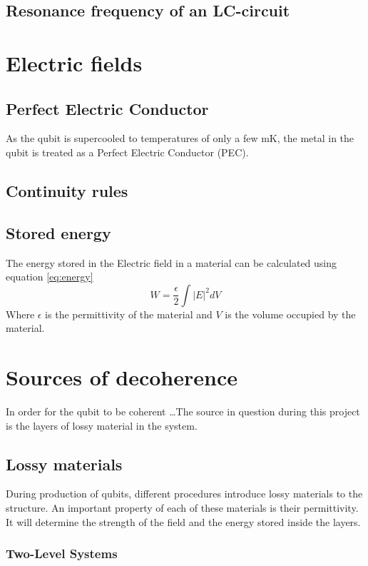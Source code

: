 \subsection{Resonance frequency of an LC-circuit}



\section{Electric fields}
\subsection{Perfect Electric Conductor}
As the qubit is supercooled to temperatures of only a few mK, the metal in the qubit is treated as a Perfect Electric Conductor (PEC).
\subsection{Continuity rules}
\subsection{Stored energy}
The energy stored in the Electric field in a material can be calculated using equation \eqref{eq:energy}
\begin{equation} \label{eq:energy}
	W = \frac{\epsilon}{2}\int{|E|}^{2}dV
\end{equation}
Where \(\epsilon\) is the permittivity of the material and \(V\) is the volume occupied by the material.

\section{Sources of decoherence}
In order for the qubit to be coherent \ldots The source in question during this project is the layers of lossy material in the system.
\subsection{Lossy materials}
During production of qubits, different procedures introduce lossy materials to the structure. An important property of each of these materials is their permittivity. It will determine the strength of the field and the energy stored inside the layers.
\subsubsection{Two-Level Systems}

